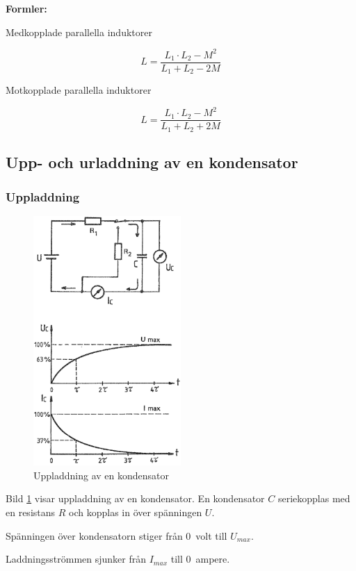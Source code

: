 \textbf{Formler:}

Medkopplade parallella induktorer

\[L = \frac{L_1 \cdot L_2 - M^2}{L_1 + L_2 - 2M}\]

Motkopplade parallella induktorer

\[L = \frac{L_1 \cdot L_2 - M^2}{L_1 + L_2 + 2M}\]

\subsection{Upp- och urladdning av en kondensator}

\subsubsection{Uppladdning}

\begin{figure}
\includegraphics[width=0.5\textwidth]{images/cropped_pdfs/bild_2_3-08.pdf}
\caption{Uppladdning av en kondensator}
\label{fig:BildII3-08}
\end{figure}

Bild \ref{fig:BildII3-08} visar uppladdning av en kondensator.
En kondensator \(C\) seriekopplas med en resistans \(R\)
och kopplas in över spänningen \(U\).

Spänningen över kondensatorn stiger från 0~volt till \(U_{max}\).

Laddningsströmmen sjunker från \(I_{max}\) till 0~ampere.

